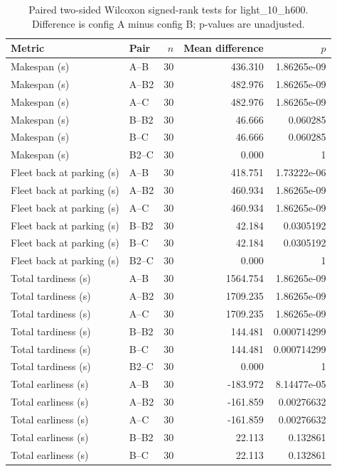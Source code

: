 \begin{table}[t]
\centering
\caption{Paired two-sided Wilcoxon signed-rank tests for light\_10\_h600. Difference is config A minus config B; p-values are unadjusted.}
\label{tab:light-10-h600-paired}
\begin{tabular}{llrrr}
\toprule
Metric & Pair & $n$ & Mean difference & $p$ \\
\midrule
Makespan (s) & A--B & 30 & 436.310 & 1.86265e-09 \\
Makespan (s) & A--B2 & 30 & 482.976 & 1.86265e-09 \\
Makespan (s) & A--C & 30 & 482.976 & 1.86265e-09 \\
Makespan (s) & B--B2 & 30 & 46.666 & 0.060285 \\
Makespan (s) & B--C & 30 & 46.666 & 0.060285 \\
Makespan (s) & B2--C & 30 & 0.000 & 1 \\
Fleet back at parking (s) & A--B & 30 & 418.751 & 1.73222e-06 \\
Fleet back at parking (s) & A--B2 & 30 & 460.934 & 1.86265e-09 \\
Fleet back at parking (s) & A--C & 30 & 460.934 & 1.86265e-09 \\
Fleet back at parking (s) & B--B2 & 30 & 42.184 & 0.0305192 \\
Fleet back at parking (s) & B--C & 30 & 42.184 & 0.0305192 \\
Fleet back at parking (s) & B2--C & 30 & 0.000 & 1 \\
Total tardiness (s) & A--B & 30 & 1564.754 & 1.86265e-09 \\
Total tardiness (s) & A--B2 & 30 & 1709.235 & 1.86265e-09 \\
Total tardiness (s) & A--C & 30 & 1709.235 & 1.86265e-09 \\
Total tardiness (s) & B--B2 & 30 & 144.481 & 0.000714299 \\
Total tardiness (s) & B--C & 30 & 144.481 & 0.000714299 \\
Total tardiness (s) & B2--C & 30 & 0.000 & 1 \\
Total earliness (s) & A--B & 30 & -183.972 & 8.14477e-05 \\
Total earliness (s) & A--B2 & 30 & -161.859 & 0.00276632 \\
Total earliness (s) & A--C & 30 & -161.859 & 0.00276632 \\
Total earliness (s) & B--B2 & 30 & 22.113 & 0.132861 \\
Total earliness (s) & B--C & 30 & 22.113 & 0.132861 \\

\end{tabular}
\end{table}
